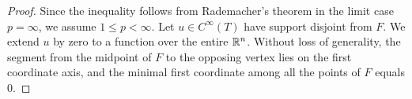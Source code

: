 \documentclass[10pt,letterpaper]{article}
\begin{document}
\begin{proof}

    Since the inequality follows from Rademacher's theorem in the limit case $p = \infty$,
    we assume $1 \leq p < \infty$. 
    Let $u \in C^{\infty}(T)$ have support disjoint from $F$.
    We extend $u$ by zero to a function over the entire ${\mathbb R}^{n}$.
    Without loss of generality, 
    the segment from the midpoint of $F$ to the opposing vertex lies on the first coordinate axis,
    and the minimal first coordinate among all the points of $F$ equals $0$. 

\end{proof}
\end{document}
